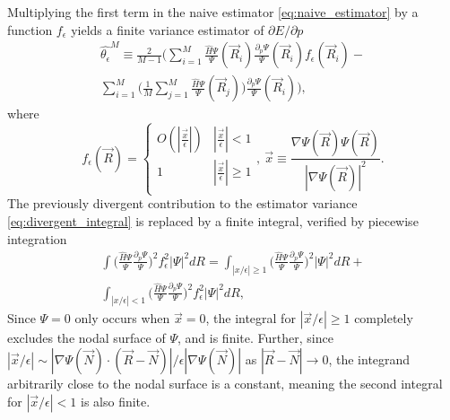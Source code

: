 \documentclass[twocolumn]{revtex4-1}
\begin{document}
Multiplying the first term in the naive estimator \eqref{eq:naive_estimator} by a function $f_\epsilon$ yields a finite variance estimator of $\partial E/\partial p$
\begin{equation}
\begin{split}
\hat{\theta_\epsilon}^M \equiv \frac{2}{M-1} \Bigg(\sum_{i=1}^M \frac{\hat{H}\Psi}{\Psi}(\vec{R}_i)\frac{\partial_p \Psi}{\Psi}(\vec{R}_i) f_\epsilon(\vec{R}_i) - \\ \sum_{i=1}^M \Big(\frac{1}{M} \sum_{j=1}^M \frac{\hat{H}\Psi}{\Psi}(\vec{R}_j)\Big)\frac{\partial_p \Psi}{\Psi}(\vec{R}_i)\Bigg), \label{eq:regularized_estimator}
\end{split}
\end{equation}
where 
\begin{equation}
f_\epsilon(\vec{R}) = \begin{cases} 
      O(|\frac{\vec{x}}{\epsilon}|) & |\frac{\vec{x}}{\epsilon}| < 1 \\
      1 & |\frac{\vec{x}}{\epsilon}| \ge 1 \\
   \end{cases},\ \vec{x} \equiv \frac{\nabla \Psi(\vec{R}) \Psi(\vec{R})}{|\nabla \Psi(\vec{R})|^2}.
\label{eq:regularizing_function}
\end{equation} 
The previously divergent contribution to the estimator variance \eqref{eq:divergent_integral} is replaced by a finite integral, verified by piecewise integration
\begin{equation}
\begin{split}
\int \Big(\frac{\hat{H}\Psi}{\Psi}\frac{\partial_p\Psi}{\Psi}\Big)^2 f_\epsilon^2 |\Psi|^2 dR = \int_{|x/\epsilon|\geq 1} \Big(\frac{\hat{H}\Psi}{\Psi}\frac{\partial_p\Psi}{\Psi}\Big)^2 |\Psi|^2 dR +\\ \int_{|x/\epsilon|< 1} \Big(\frac{\hat{H}\Psi}{\Psi}\frac{\partial_p\Psi}{\Psi}\Big)^2 f_\epsilon^2 |\Psi|^2 dR,
\end{split}
\label{eq:convergent_integral}
\end{equation}
Since $\Psi = 0$ only occurs when $\vec{x} = 0$, the integral for $|\vec{x}/\epsilon|\geq 1$ completely excludes the nodal surface of $\Psi$, and is finite. 
Further, since $|\vec{x}/\epsilon| \sim |\nabla\Psi(\vec{N}) \cdot (\vec{R}-\vec{N})|/\epsilon|\nabla  \Psi(\vec{N})|$ as $|\vec{R} - \vec{N}| \rightarrow 0$, the integrand arbitrarily close to the nodal surface is a constant, meaning the second integral for $|\vec{x}/\epsilon| < 1$ is also finite.
\end{document}
